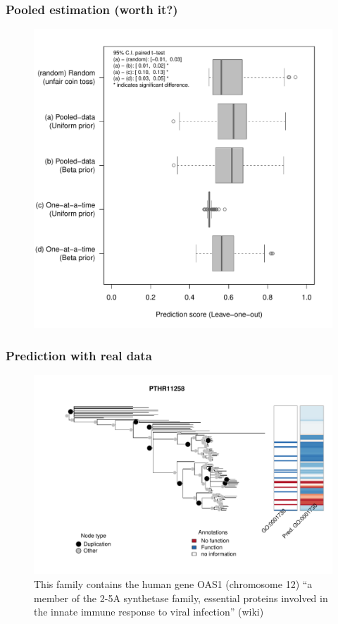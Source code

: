 \documentclass[aspectratio=169, 9pt]{beamer}\usepackage[]{graphicx}\usepackage[]{color}
\begin{document}

\begin{frame}
\frametitle{Pooled estimation (worth it?)}

\begin{figure}
\centering
\includegraphics[width=.5\linewidth]{pooled-or-single.pdf}
\end{figure}

\end{frame}

\begin{frame}
\frametitle{Prediction with real data}

\begin{figure}
\centering
\includegraphics[width=.7\linewidth, trim = 0 1.25cm 0 .5cm, clip]{fig/example-trees-good1.pdf}
\caption{This family contains the human gene OAS1 (chromosome 12) ``a member of the 2-5A synthetase family, essential proteins involved in the innate immune response to viral infection'' (wiki)}
\end{figure}

\end{frame}
\end{document}
